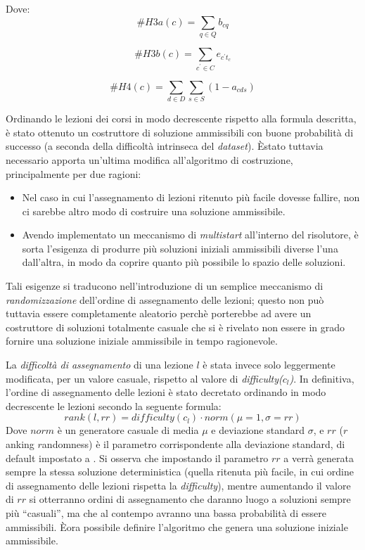 \documentclass[]{article}
\newcommand{\q}[1]{``#1''}
\newcommand{\E}{È}
\begin{document}
Dove:
\[\#{H3a}(c) = \sum_{q \in Q} b_{cq}\]
\begin{center}
\end{center}

\[\#{H3b}(c) = \sum_{c^\prime \in C} e_{c^\prime t_{c}}\]
\begin{center}
\end{center}

\[\#{H4}(c) = \sum_{d \in D} \sum_{s \in S} (1 -a_{cds})\]
\begin{center}
\end{center}

Ordinando le lezioni dei corsi in modo decrescente rispetto alla formula descritta, è stato ottenuto un costruttore di soluzione ammissibili con buone probabilità di successo (a seconda della difficoltà intrinseca del \textit{dataset}).
\E stato tuttavia necessario apporta un'ultima modifica all'algoritmo di costruzione, principalmente per due ragioni:
\begin{itemize}
	\item Nel caso in cui l'assegnamento di lezioni ritenuto più facile dovesse fallire, non ci sarebbe altro modo di costruire una soluzione ammissibile.
	\item Avendo implementato un meccanismo di \textit{multistart} all'interno del risolutore, è sorta l'esigenza di produrre più soluzioni iniziali ammissibili diverse l'una dall'altra, in modo da coprire quanto più possibile lo spazio delle soluzioni.
\end{itemize}
Tali esigenze si traducono nell'introduzione di un semplice meccanismo di \textit{randomizzazione} dell'ordine di assegnamento delle lezioni; questo non può tuttavia essere completamente aleatorio  perchè porterebbe ad avere un costruttore di soluzioni totalmente casuale che si è rivelato non essere in grado fornire una soluzione iniziale ammissibile in tempo ragionevole.

La \textit{difficoltà di assegnamento} di una lezione $l$ è stata invece solo leggermente modificata, per un valore casuale, rispetto al valore di \textit{difficulty($c_l$)}.
In definitiva, l'ordine di assegnamento delle lezioni è stato decretato ordinando in modo decrescente le lezioni secondo la seguente formula:
\[ \mathit{rank}(l,rr) = \mathit{difficulty}(c_l) \cdot \mathit{norm}(\mu=1, \sigma=rr) \]
Dove $norm$ è un generatore casuale di media $\mu$ e deviazione standard $\sigma$, e $rr$ ($r$anking $r$andomness) è il parametro corrispondente alla deviazione standard, di default impostato a .
Si osserva che impostando il parametro $rr$ a  verrà generata sempre la stessa soluzione deterministica (quella ritenuta più facile, in cui ordine di assegnamento delle lezioni rispetta la \textit{difficulty}), mentre aumentando il valore di $rr$ si otterranno ordini di assegnamento che daranno luogo a soluzioni sempre più \q{casuali}, ma che al contempo avranno una bassa probabilità di essere ammissibili. \E ora possibile definire l'algoritmo che genera una soluzione iniziale ammissibile.
\end{document}
